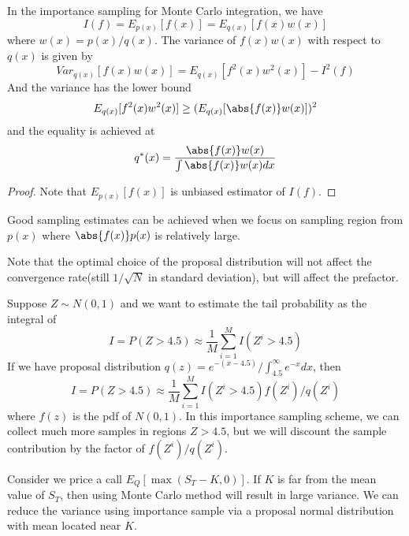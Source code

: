 \begin{refsection}
\begin{lemma}\cite{andrieu2003introduction}\cite[95]{robert2013monte}\cite{mcbook}
	In the importance sampling for Monte Carlo integration, we have
	$$I(f) = E_{p(x)}[f(x)] = E_{q(x)}[f(x)w(x)]$$
	where $w(x) = p(x)/q(x)$.
	The variance of $f(x)w(x)$ with respect to $q(x)$ is given by
	$$Var_{q(x)}[f(x)w(x)] = E_{q(x)}[f^2(x)w^2(x)] - I^2(f)$$
	And the variance has the lower bound
	$$E_{q(x)}[f^2(x)w^2(x)] \geq (E_{q(x)}[\abs{f(x)}w(x)])^2$$
	and the equality is achieved at 
	$$q^*(x) = \frac{\abs{f(x)}w(x)}{\int \abs{f(x)}w(x) dx}$$
\end{lemma}
\begin{proof}
	Note that $E_{p(x)}[f(x)]$ is unbiased estimator of $I(f)$. 
\end{proof}


\begin{remark}[interpretation]
	Good sampling estimates can be achieved when we focus on sampling region from $p(x)$ where $\abs{f(x)}p(x)$ is relatively large.
\end{remark}

\begin{remark}
	Note that the optimal choice of the proposal distribution will not affect the convergence rate(still $1/\sqrt{N}$ in standard deviation), but will affect the prefactor.
\end{remark}



\begin{example}\cite[93]{robert2013monte}
	Suppose $Z\sim N(0,1)$ and we want to estimate the tail probability as the integral of
	$$I = P(Z > 4.5) \approx \frac{1}{M}\sum_{i=1}^M I(Z^i>4.5)$$
	If we have proposal distribution $q(z) = e^{-(x-4.5)}/\int_{4.5}^\infty e^{-x}dx$, then 
	$$I = P(Z > 4.5) \approx \frac{1}{M}\sum_{i=1}^M I(Z^i>4.5) f(Z^i)/q(Z^i)$$
	where $f(z)$ is the pdf of $N(0,1)$.
	In this importance sampling scheme, we can collect much more samples in regions $Z>4.5$, but we will discount the sample contribution by the factor of $f(Z^i)/q(Z^i) $.
\end{example}



\begin{example}
	Consider we price a call $E_Q[\max(S_T-K,0)]$. If $K$ is far from the mean value of $S_T$, then using Monte Carlo method will result in large variance. We can reduce the variance using importance sample via a proposal normal distribution with mean located near $K$.
\end{example}



\end{refsection}
